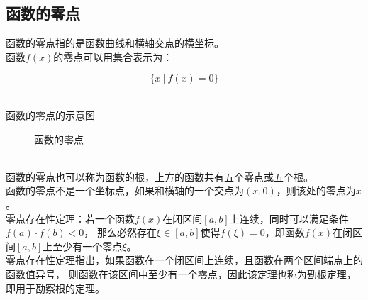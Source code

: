 \documentclass[UTF8]{ctexart}
\begin{document}
\newpage

\subsection{函数的零点}
    函数的零点指的是函数曲线和横轴交点的横坐标。\\[3mm]
    函数$f(x)$的零点可以用集合表示为：
    \begin{large}
        \begin{equation*}
            \big\{x~|~f(x)=0\big\}
        \end{equation*}
    \end{large}\\
    函数的零点的示意图
    \begin{figure}[h]
        \begin{center}
            \caption{函数的零点}
        \end{center}
    \end{figure}\\
    函数的零点也可以称为函数的根，上方的函数共有五个零点或五个根。\\[3mm]
    函数的零点不是一个坐标点，如果和横轴的一个交点为$(x,0)$，则该处的零点为$x$。\\[6mm]
    零点存在性定理：若一个函数$f(x)$在闭区间$[a,b]$上连续，同时可以满足条件$f(a)\cdot f(b)<0$，
    那么必然存在$\xi\in[a,b]$使得$f(\xi)=0$，即函数$f(x)$在闭区间$[a,b]$上至少有一个零点$\xi$。\\[3mm]
    零点存在性定理指出，如果函数在一个闭区间上连续，且函数在两个区间端点上的函数值异号，
    则函数在该区间中至少有一个零点，因此该定理也称为勘根定理，即用于勘察根的定理。
\end{document}
